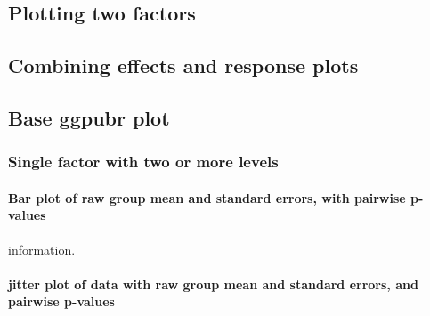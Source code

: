 \documentclass[]{book}
\let\oldparagraph\paragraph
\renewcommand{\paragraph}[1]{\oldparagraph{#1}\mbox{}}
\begin{document}
\subsection{Plotting two factors}\label{plotting-two-factors}

\subsection{Combining effects and response
plots}\label{combining-effects-and-response-plots}

\subsection{Base ggpubr plot}\label{base-ggpubr-plot}

\subsubsection{Single factor with two or more
levels}\label{single-factor-with-two-or-more-levels}

\paragraph{Bar plot of raw group mean and standard errors, with pairwise
p-values}\label{bar-plot-of-raw-group-mean-and-standard-errors-with-pairwise-p-values}

information.

\paragraph{jitter plot of data with raw group mean and standard errors,
and pairwise
p-values}\label{jitter-plot-of-data-with-raw-group-mean-and-standard-errors-and-pairwise-p-values}
\end{document}
